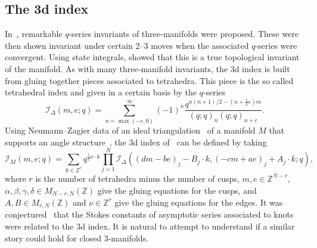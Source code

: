 \documentclass[pdftex]{sigma}
\numberwithin{equation}{section}
\def\BZ{\mathbb{Z}}
\def\BZ{\mathbb Z}
\begin{document}
\subsection{The 3d index}
In~\cite{DGG}, remarkable $q$-series invariants of three-manifolds were proposed. These were then shown invariant under certain 2--3 moves when the associated $q$-series were convergent. Using state integrals, \cite{GK:3dind} showed that this is a true topological invariant of the manifold. As with many three-manifold invariants, the 3d index is built from gluing together pieces associated to tetrahedra. This piece is the so called tetrahedral index and given in a certain basis by the $q$-series
\[
 \mathcal{I}_{\Delta}(m,e;q)
  =
 \sum_{n=\max(-e,0)}^{\infty}(-1)^{n}\frac{q^{n(n+1)/2-(n+\frac{1}{2}e)m}}{(q;q)_{n}(q;q)_{n+e}} .
\]
Using Neumann--Zagier data of an ideal triangulation~\cite{NeuZag} of a manifold $M$ that supports an angle structure~\cite{Gar3d}, the 3d index of~\cite{DGG} can be defined by taking
\[
 \mathcal{I}_{M}(m,e;q)
  =
 \sum_{k\in\BZ^{r}}q^{\frac{1}{2}\nu\cdot k}\prod_{j=1}^{N}\mathcal{I}_{\Delta}((dm-be)_j-B_j\cdot k,(-cm+ae)_j+A_j\cdot k;q),
\]
where $r$ is the number of tetrahedra minus the number of cusps, $m,e\in\BZ^{N-r}$, $\alpha,\beta,\gamma,\delta\in M_{N-r,N}(\BZ)$ give the gluing equations for the cusps, and $A,B\in M_{r,N}(\BZ)$ and $\nu\in\BZ^{r}$ give the gluing equations for the edges. It was conjectured~\cite{GGM:I,GrassiGM,Marino} that the Stokes constants of asymptotic series associated to knots were related to the 3d index. It is natural to attempt to understand if a similar story could hold for closed $3$-manifolds.
\end{document}

